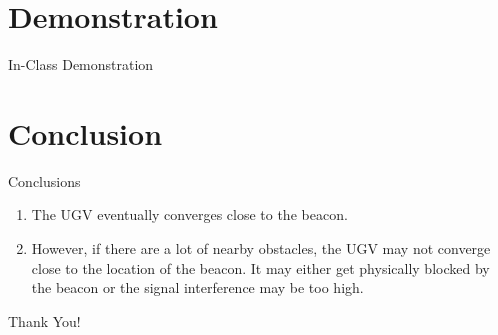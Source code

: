 \documentclass{beamer}
\theoremstyle{remark}
\begin{document}
\section{Demonstration}
\begin{frame}
    \begin{center}
        \Huge In-Class Demonstration
    \end{center}
\end{frame}

\section{Conclusion}
\begin{frame}{Conclusions}
    \begin{enumerate}
        \item The UGV eventually converges close to the beacon.
        \pause
        \item However, if there are a lot of nearby obstacles, the UGV may not 
        converge close to the location of the beacon. It may either get physically 
        blocked by the beacon or the signal interference may be too high.
    \end{enumerate}
\end{frame}

\begin{frame}
    \begin{center}
        \Huge Thank You!
    \end{center}
\end{frame}
\end{document}
